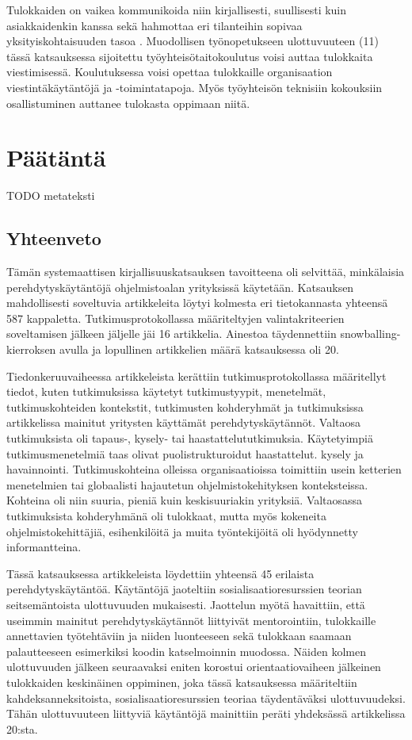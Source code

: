 \documentclass[utf8]{gradu3}
\begin{document}
Tulokkaiden on vaikea kommunikoida niin kirjallisesti, suullisesti kuin asiakkaidenkin kanssa sekä hahmottaa eri tilanteihin sopivaa yksityiskohtaisuuden tasoa %
\parencites%
    {radermacher-ym-2015}%
    {begel-simon-2008}%
\relax.
%
Muodollisen työnopetukseen ulottuvuuteen (11) tässä katsauksessa sijoitettu työyhteisötaitokoulutus voisi auttaa tulokkaita viestimisessä. Koulutuksessa voisi opettaa tulokkaille organisaation viestintäkäytäntöjä ja -toimintatapoja. Myös työyhteisön teknisiin kokouksiin osallistuminen auttanee tulokasta oppimaan niitä.

\chapter{Päätäntä}
\label{paaluku-paatanta}

TODO metateksti

\section{Yhteenveto}

Tämän systemaattisen kirjallisuuskatsauksen tavoitteena oli selvittää, minkälaisia perehdytyskäytäntöjä ohjelmistoalan yrityksissä käytetään. Katsauksen mahdollisesti soveltuvia artikkeleita löytyi kolmesta eri tietokannasta yhteensä 587 kappaletta. Tutkimusprotokollassa määriteltyjen valintakriteerien soveltamisen jälkeen jäljelle jäi 16 artikkelia. Ainestoa täydennettiin snowballing-kierroksen avulla ja lopullinen artikkelien määrä katsauksessa oli 20.

Tiedonkeruuvaiheessa artikkeleista kerättiin tutkimusprotokollassa määritellyt tiedot, kuten tutkimuksissa käytetyt tutkimustyypit, menetelmät, tutkimuskohteiden kontekstit, tutkimusten kohderyhmät ja tutkimuksissa artikkelissa mainitut yritysten käyttämät perehdytyskäytännöt. Valtaosa tutkimuksista oli tapaus-, kysely- tai haastattelututkimuksia. Käytetyimpiä tutkimusmenetelmiä taas olivat puolistrukturoidut haastattelut. kysely ja havainnointi. Tutkimuskohteina olleissa organisaatioissa toimittiin usein ketterien menetelmien tai globaalisti hajautetun ohjelmistokehityksen  konteksteissa. Kohteina oli niin suuria, pieniä kuin keskisuuriakin yrityksiä. Valtaosassa tutkimuksista kohderyhmänä oli tulokkaat, mutta myös kokeneita ohjelmistokehittäjiä, esihenkilöitä ja muita työntekijöitä oli hyödynnetty informantteina. 

Tässä katsauksessa artikkeleista löydettiin yhteensä 45 erilaista perehdytyskäytäntöä. Käytäntöjä jaoteltiin sosialisaatioresurssien teorian seitsemäntoista ulottuvuuden mukaisesti. Jaottelun myötä havaittiin, että useimmin mainitut perehdytyskäytännöt liittyivät mentorointiin, tulokkaille annettavien työtehtäviin ja niiden luonteeseen sekä tulokkaan saamaan palautteeseen esimerkiksi koodin katselmoinnin muodossa. Näiden kolmen ulottuvuuden jälkeen seuraavaksi eniten korostui orientaatiovaiheen jälkeinen tulokkaiden keskinäinen oppiminen, joka tässä katsauksessa määriteltiin kahdeksanneksitoista, sosialisaatioresurssien teoriaa täydentäväksi ulottuvuudeksi. Tähän ulottuvuuteen liittyviä käytäntöjä mainittiin peräti yhdeksässä artikkelissa 20:sta.
\end{document}
